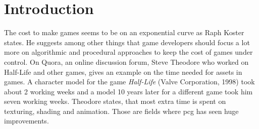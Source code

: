 \documentclass[10pt,a4paper]{article}
\begin{document}
\section{Introduction}\label{sec:Introduction}
\begin{multicols}{2}
The cost to make games seems to be on an exponential curve as Raph Koster states. He suggests among other things that game developers should focus a lot more on algorithmic and procedural approaches to keep the cost of games under control\cite{Koster2018}. On Quora, an online discussion forum, Steve Theodore who worked on Half-Life and other games, gives an example on the time needed for assets in games. A character model for the game \textit{Half-Life} (Valve Corporation, 1998) took about 2 working weeks and a model 10 years later for a different game took him seven working weeks. Theodore states, that most extra time is spent on texturing, shading and animation\cite{Prinke2017}. Those are fields where \gls{pcg} has seen huge improvements.


\end{multicols}
\end{document}
